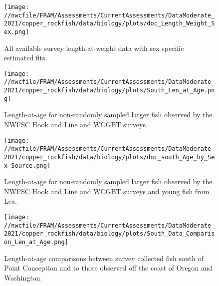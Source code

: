 \documentclass[11pt,
  english,
  a4paper,
]{article}
\begin{document}
\begin{figure}
\centering
\texttt{[image: //nwcfile/FRAM/Assessments/CurrentAssessments/DataModerate\_2021/copper\_rockfish/data/biology/plots/doc\_Length\_Weight\_Sex.png]}
\caption{All available survey length-at-weight data with sex specific estimated fits.\label{fig:len-weight}}
\end{figure}

\tagmcend\tagstructend


\begin{figure}
\centering
\texttt{[image: //nwcfile/FRAM/Assessments/CurrentAssessments/DataModerate\_2021/copper\_rockfish/data/biology/plots/South\_Len\_at\_Age.png]}
\caption{Length-at-age for non-randomly sampled larger fish observed by the NWFSC Hook and Line and WCGBT surveys.\label{fig:survey-len-at-age-data}}
\end{figure}

\tagmcend\tagstructend


\begin{figure}
\centering
\texttt{[image: //nwcfile/FRAM/Assessments/CurrentAssessments/DataModerate\_2021/copper\_rockfish/data/biology/plots/doc\_south\_Age\_by\_Sex\_Source.png]}
\caption{Length-at-age for non-randomly sampled larger fish observed by the NWFSC Hook and Line and WCGBT surveys and young fish from Lea.\label{fig:south-len-at-age-data}}
\end{figure}

\tagmcend\tagstructend


\begin{figure}
\centering
\texttt{[image: //nwcfile/FRAM/Assessments/CurrentAssessments/DataModerate\_2021/copper\_rockfish/data/biology/plots/South\_Data\_Comparison\_Len\_at\_Age.png]}
\caption{Length-at-age comparisons between survey collected fish south of Point Conception and to those observed off the coast of Oregon and Washington.\label{fig:len-at-age-comp}}
\end{figure}
\end{document}
